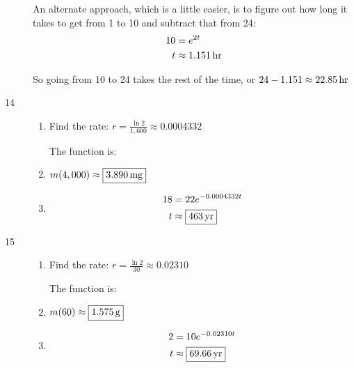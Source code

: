 \documentclass{exam}
\begin{document}
\begin{description}
        An alternate approach, which is a little easier, is to figure out how long it takes to get from 1 to 10 and
        subtract that from 24:
        \begin{align*}
          10 & = e^{2t} \\
          t  & \approx \unit[1.151]{hr} \\
        \end{align*}

        So going from 10 to 24 takes the rest of the time, or $24 - 1.151 \approx \unit[22.85]{hr} $

      \item[14] 
        \begin{enumerate}[a]
          \item Find the rate: $r = \frac{\ln 2}{1,600} \approx 0.0004332$

            The function is: 

          \item $m(4,000) \approx \boxed{\unit[3.890]{mg}}$

          \item
            \begin{align*}
              18 & = 22 e^{-0.0004332 t} \\
              t  & \approx \boxed{\unit[463]{yr}} \\
            \end{align*}

        \end{enumerate}

      \item[15] 
        \begin{enumerate}[a]
          \item Find the rate: $r = \frac{\ln 2}{30} \approx 0.02310$

            The function is: 

          \item $m(60) \approx \boxed{\unit[1.575]{g}}$

          \item
            \begin{align*}
              2 & = 10 e^{-0.02310 t} \\
              t  & \approx \boxed{\unit[69.66]{yr}} \\
            \end{align*}

        \end{enumerate}


\end{description}
\end{document}
